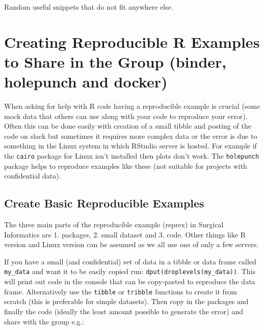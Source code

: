 \documentclass[]{book}
\theoremstyle{definition}
\theoremstyle{definition}
\theoremstyle{definition}
\theoremstyle{remark}
\begin{document}
Random useful snippets that do not fit anywhere else.

\hypertarget{creating-reproducible-r-examples-to-share-in-the-group-binder-holepunch-and-docker}{%
\section{Creating Reproducible R Examples to Share in the Group (binder,
holepunch and
docker)}\label{creating-reproducible-r-examples-to-share-in-the-group-binder-holepunch-and-docker}}

When asking for help with R code having a reproducible example is
crucial (some mock data that others can use along with your code to
reproduce your error). Often this can be done easily with creation of a
small tibble and posting of the code on slack but sometimes it requires
more complex data or the error is due to something in the Linux system
in which RStudio server is hosted. For example if the \texttt{cairo}
package for Linux isn't installed then plots don't work. The
\texttt{holepunch} package helps to reproduce examples like these (not
suitable for projects with confidential data).

\hypertarget{create-basic-reproducible-examples}{%
\subsection{Create Basic Reproducible
Examples}\label{create-basic-reproducible-examples}}

The three main parts of the reproducible example (reprex) in Surgical
Informatics are 1. packages, 2. small dataset and 3. code. Other things
like R version and Linux version can be assumed as we all use one of
only a few servers.

If you have a small (and confidential) set of data in a tibble or data
frame called \texttt{my\_data} and want it to be easily copied run:
\texttt{dput(droplevels(my\_data))}. This will print out code in the
console that can be copy-pasted to reproduce the data frame.
Alternatively use the \texttt{tibble} or \texttt{tribble} functions to
create it from scratch (this is preferable for simple datasets). Then
copy in the packages and finally the code (ideally the least amount
possible to generate the error) and share with the group e.g.:
\end{document}
